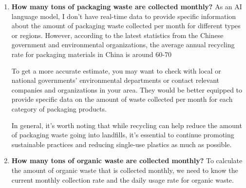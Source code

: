 \begin{enumerate}
1. **Recycling Programs**: Many facilities employ specific recycling programs that involve sorting, collecting, and processing various types of materials. For example:
   - Composting: This is often done by composting food scraps to generate compost which can be used as fertilizer.
   - Metal recycling: Facilities might recycle metals like aluminum cans, metal utensils, etc., into new products.

2. **Processing Rates**: These rates are typically calculated based on how much of each type of material the facility processes per month. For example:
   - If a facility recycles 1 ton of recyclables per day, they would process 10,000 tons per year (60 days).
   - If it takes an average of 30 minutes to sort through and separate materials for recycling, they might process up to 2 tons of non-recyclable waste each day.

Without specific data from your facility, I can't provide an exact number. However, if you could share the current monthly volume or percentage of materials processed, we could make a more precise calculation.

For example:
- **If a facility recycles all 1 ton of recyclables per day** (60 days), they would process \( \frac{1}{60} \) tons of residual waste each month.
- If the processing rate is higher than that, you can calculate how much weight comes out of your monthly collection.

I'll need more details to proceed.
\item \textbf{How many tons of packaging waste are collected monthly?}
As an AI language model, I don't have real-time data to provide specific information about the amount of packaging waste collected per month for different types or regions. However, according to the latest statistics from the Chinese government and environmental organizations, the average annual recycling rate for packaging materials in China is around 60-70%

To get a more accurate estimate, you may want to check with local or national governments' environmental departments or contact relevant companies and organizations in your area. They would be better equipped to provide specific data on the amount of waste collected per month for each category of packaging products.

In general, it's worth noting that while recycling can help reduce the amount of packaging waste going into landfills, it's essential to continue promoting sustainable practices and reducing single-use plastics as much as possible.
\item \textbf{How many tons of organic waste are collected monthly?}
To calculate the amount of organic waste that is collected monthly, we need to know the current monthly collection rate and the daily usage rate for organic waste.


\end{enumerate}
